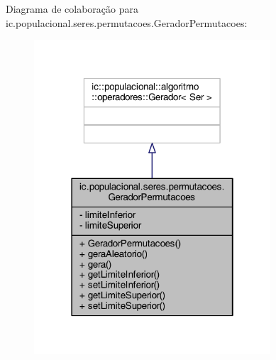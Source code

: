 Diagrama de colaboração para ic.\-populacional.\-seres.\-permutacoes.\-Gerador\-Permutacoes\-:
\nopagebreak
\begin{figure}[H]
\begin{center}
\leavevmode
\includegraphics[width=250pt]{classic_1_1populacional_1_1seres_1_1permutacoes_1_1_gerador_permutacoes__coll__graph}
\end{center}
\end{figure}
